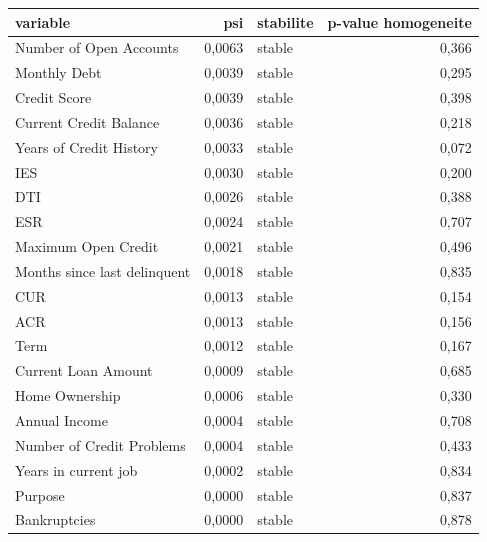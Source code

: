 \begin{tabular}{lrlr}
\toprule
\textbf{variable} & \textbf{psi} & \textbf{stabilite} & \textbf{p-value homogeneite} \\
\midrule
Number of Open Accounts & 0,0063 & stable & 0,366 \\
Monthly Debt & 0,0039 & stable & 0,295 \\
Credit Score & 0,0039 & stable & 0,398 \\
Current Credit Balance & 0,0036 & stable & 0,218 \\
Years of Credit History & 0,0033 & stable & 0,072 \\
IES & 0,0030 & stable & 0,200 \\
DTI & 0,0026 & stable & 0,388 \\
ESR & 0,0024 & stable & 0,707 \\
Maximum Open Credit & 0,0021 & stable & 0,496 \\
Months since last delinquent & 0,0018 & stable & 0,835 \\
CUR & 0,0013 & stable & 0,154 \\
ACR & 0,0013 & stable & 0,156 \\
Term & 0,0012 & stable & 0,167 \\
Current Loan Amount & 0,0009 & stable & 0,685 \\
Home Ownership & 0,0006 & stable & 0,330 \\
Annual Income & 0,0004 & stable & 0,708 \\
Number of Credit Problems & 0,0004 & stable & 0,433 \\
Years in current job & 0,0002 & stable & 0,834 \\
Purpose & 0,0000 & stable & 0,837 \\
Bankruptcies & 0,0000 & stable & 0,878 \\
\bottomrule
\end{tabular}
